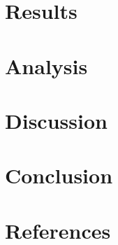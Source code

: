 \documentclass{article}
\begin{document}
\section{Results}

\section{Analysis}

\section{Discussion}

\section{Conclusion	}

\section{References	}
\end{document}
